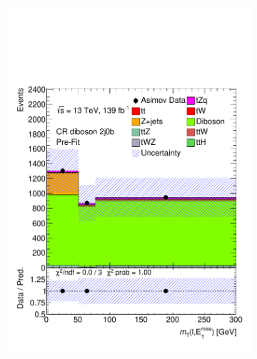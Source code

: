 \begin{figure}[!h]
\begin{subfigure}[b]{0.33\linewidth}
    \includegraphics[width=\textwidth]{ubonn-thesis/Chapters/Chapters_07/Figure/Asmiov/CR_2j0b.pdf} 
  \end{subfigure}%
  \begin{subfigure}[b]{0.33\linewidth}
    \centering

\end{subfigure}
\end{figure}
